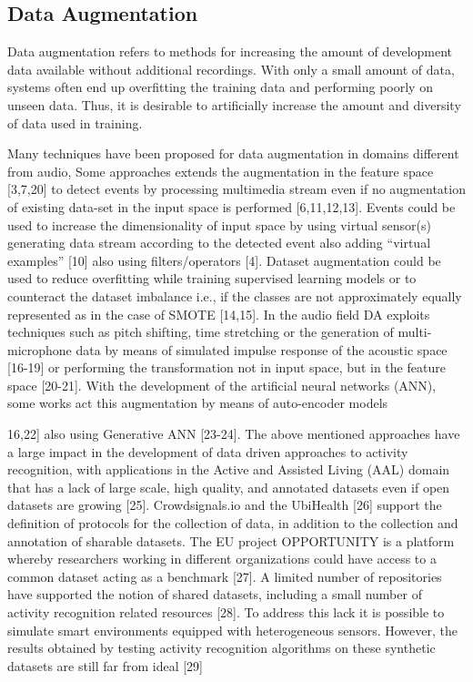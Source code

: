\subsection{Data Augmentation}
Data augmentation refers to methods for increasing the amount of development data
available without additional recordings. With only a small amount of data, systems
often end up overfitting the training data and performing poorly on unseen data.
Thus, it is desirable to artificially increase the amount and diversity of data used in
training. 

Many techniques have been proposed for data augmentation in domains different from audio, Some approaches extends the augmentation in the feature space [3,7,20] to detect events by processing multimedia stream even if no augmentation of existing data-set in the input space is performed [6,11,12,13]. Events could be used to increase the dimensionality of input space by using virtual sensor(s) generating data stream according to the detected event also adding “virtual examples” [10] also using filters/operators [4]. Dataset augmentation could be used to reduce overfitting while training supervised learning models or to counteract the dataset imbalance i.e., if the classes are not approximately equally represented as in the case of SMOTE [14,15]. In the audio field DA exploits techniques such as pitch shifting, time stretching or the generation of multi-microphone data by means of simulated impulse response of the acoustic space [16-19] or performing the transformation not in input space, but in the feature space [20-21]. With the development of the artificial neural networks (ANN), some works act this augmentation by means of auto-encoder models

16,22] also using Generative ANN [23-24]. The above mentioned approaches have a large impact in the development of data driven approaches to activity recognition, with applications in the Active and Assisted Living (AAL) domain that has a lack of large scale, high quality, and annotated datasets even if open datasets are growing [25]. Crowdsignals.io and the UbiHealth [26] support the definition of protocols for the collection of data, in addition to the collection and annotation of sharable datasets. The EU project OPPORTUNITY is a platform whereby researchers working in different organizations could have access to a common dataset acting as a benchmark [27]. 
A limited number of repositories have supported the notion of shared datasets, including a small number of activity recognition related resources [28]. To address this lack it is possible to simulate smart environments equipped with heterogeneous sensors. However, the results obtained by testing activity recognition algorithms on these synthetic datasets are still far from ideal [29]

